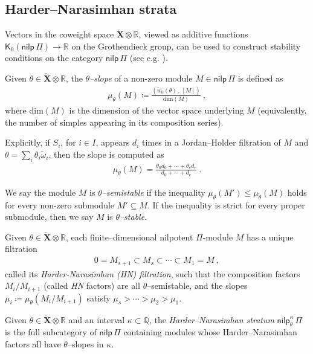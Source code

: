 \documentclass[reqno,a4paper]{amsart}
\newcommand{\Q}{\mathbb{Q}}
\newcommand{\R}{\mathbb{R}}
\newcommand{\sfK}{\mathsf{K}}
\newcommand{\bfX}{\mathbf{X}}
\newcommand{\nilpPi}{\mathsf{nilp}\, \Pi}
\newcommand{\nilp}{\mathsf{nilp}}
\newcommand{\Lomega}{\check{\omega}}
\newcommand{\Ltheta}{\check{\theta}}
\newcommand{\weightlattice}{\bfX}
\newcommand{\coweightlattice}{\check{\weightlattice}}
\theoremstyle{basic-theorem}
\numberwithin{equation}{section}
\begin{document}
\subsection{Harder--Narasimhan strata}

Vectors in the coweight space $\coweightlattice\otimes \R$, viewed as additive functions $\sfK_0(\nilpPi)\to \R$ on the Grothendieck group, can be used to construct stability conditions on the category $\nilpPi$ (see e.g. \cite[\S2.3]{Ginzburg_Quiver}).
\begin{definition}\label{def:slopefunction}
	Given $\theta\in \coweightlattice\otimes \R$, the \textit{$\theta$--slope} of a non-zero module $M\in \nilpPi$ is defined as
	\begin{align}
		\mu_{\theta}(M) \coloneqq \frac{( \widetilde{w}_0(\theta)\,,\,[M])}{\text{dim}(M)}\ ,
	\end{align}
    where $\text{dim}(M)$ is the dimension of the vector space underlying $M$ (equivalently, the number of simples appearing in its composition
    series).
\end{definition}
Explicitly, if $S_i$, for $i\in I$, appears $d_i$ times in a Jordan--Holder filtration of $M$ and $\theta=\sum_i \theta_i\Lomega_i$, then the slope is computed as
\begin{align}
	\mu_\theta(M)=\frac{\theta_0d_0+\cdots+\theta_ed_e}{d_0+\cdots+d_e}\ .
\end{align}

\begin{definition}
    We say the module $M$ is \textit{$\theta$--semistable} if the inequality $\mu_{\theta}(M')\leq \mu_{\Ltheta}(M)$ holds for every non-zero submodule $M'\subseteq M$. If the inequality is strict for every proper submodule, then we say $M$ is \textit{$\theta$--stable}.
\end{definition}

Given $\theta\in \coweightlattice\otimes\R$, each finite--dimensional nilpotent $\Pi$-module $M$ has a unique filtration
\begin{align}\label{eq:HN-filtration-representations}
    0 = M_{s+1}\subset M_s\subset \cdots\subset M_1=M\ ,
\end{align}
called its \textit{Harder-Narasimhan (HN) filtration}, such that the composition factors $M_i/M_{i+1}$ (called \textit{HN} factors) are all $\theta$--semistable, and the slopes $\mu_i \coloneqq \mu_{\theta}(M_i/M_{i+1})$ satisfy $\mu_s>\cdots>\mu_2>\mu_1$.

\begin{definition}\label{def:kappa}
	Given $\theta\in \coweightlattice\otimes\R$ and an interval $\kappa\subset\Q$, the \textit{Harder--Narasimhan stratum} $\nilp^{\kappa}_{\theta}\, \Pi$ is the full subcategory of $\nilpPi$ containing modules whose Harder--Narasimhan factors all have $\theta$--slopes in $\kappa$.
\end{definition}
\end{document}
